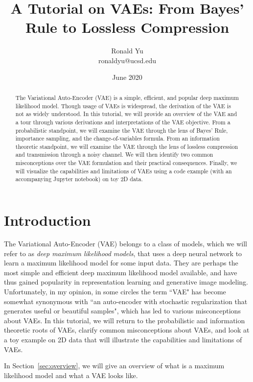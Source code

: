 \documentclass{article}
\title{A Tutorial on VAEs: From Bayes' Rule to Lossless Compression}
\author{Ronald Yu\\ ronaldyu@ucsd.edu }
\date{June 2020}
\begin{document}
\maketitle

\begin{abstract}
    The Variational Auto-Encoder (VAE) is a simple, efficient, and popular deep maximum likelihood model. 
    Though usage of VAEs is widespread, the derivation of the VAE is not as widely understood.
    In this tutorial, we will provide an overview of the VAE and a tour through various derivations and interpretations of the VAE objective. From a probabilistic standpoint, we will examine the VAE through the lens of Bayes' Rule, importance sampling, and the change-of-variables formula. From an information theoretic standpoint, we will examine the VAE through the lens of lossless compression and transmission through a noisy channel. 
    We will then identify two common misconceptions over the VAE formulation and their practical consequences.
    Finally, we will visualize the capabilities and limitations of VAEs using a code example (with an accompanying Jupyter notebook) on toy 2D data.
\end{abstract}

\section{Introduction}

The Variational Auto-Encoder (VAE) belongs to a class of models, which we will refer to as \emph{deep maximum likelihood models}, that uses a deep neural network to learn a maximum likelihood model for some input data.
They are perhaps the most simple and efficient deep maximum likelihood model available, and have thus gained popularity in representation learning and generative image modeling.
Unfortunately, in my opinion, in some circles the term ``VAE" has become somewhat synonymous with ``an auto-encoder with stochastic regularization that generates useful or beautiful samples", which has led to various misconceptions about VAEs.
In this tutorial, we will return to the probabilistic and information theoretic roots of VAEs, clarify common misconceptions about VAEs, and look at a toy example on 2D data that will illustrate the capabilities and limitations of VAEs.

In Section~\ref{sec:overview}, we will give an overview of what is a maximum likelihood model and what a VAE looks like.
\end{document}
